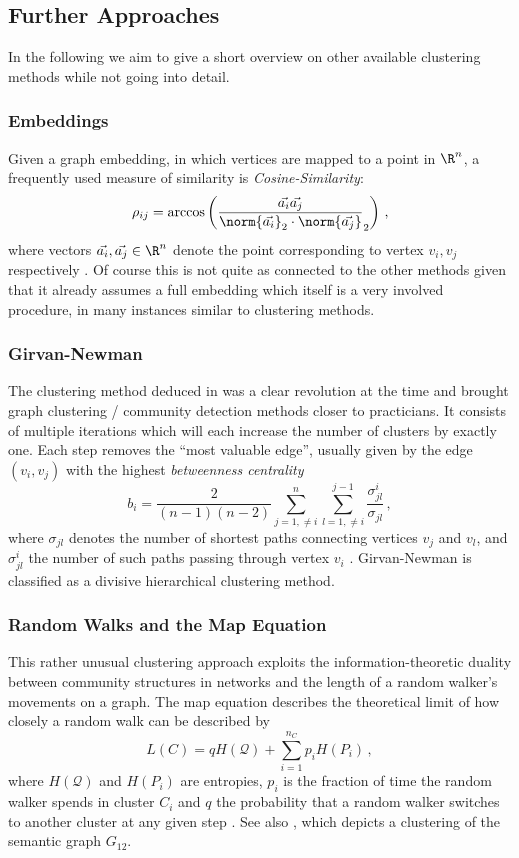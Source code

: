 \documentclass{prettytex/ox/mmsc-special-topic}
\begin{document}
  \subsection{Further Approaches}
  In the following we aim to give a short overview on other available clustering methods while not going into detail.

  \subsubsection{Embeddings}
  Given a graph embedding, in which vertices are mapped to a point in $\R^n$, a frequently used measure of similarity is \textit{Cosine-Similarity}:
  $$\rho_{ij} = \arccos\left(\frac{\vec{a_i} \vec{a_j}}{\norm{\vec{a_i}}_2 \cdot \norm{\vec{a_j}}}_2\right)\,,$$
  where vectors $\vec{a_i}, \vec{a_j} \in \R^n$ denote the point corresponding to vertex $v_i, v_j$ respectively \parencite{fortunato}.
  Of course this is not quite as connected to the other methods given that it already assumes a full embedding which itself is a very involved procedure, in many instances similar to clustering methods.

  \subsubsection{Girvan-Newman}
  The clustering method deduced in \cite{girvan-newman} was a clear revolution at the time and brought graph clustering / community detection methods closer to practicians.
  It consists of multiple iterations which will each increase the number of clusters by exactly one. Each step removes the ``most valuable edge'', usually given by the edge $(v_i, v_j)$ with the highest \textit{betweenness centrality} $$b_i = \frac{2}{(n-1)(n-2)} \sum_{j=1, \neq i}^n \sum_{l=1, \neq i}^{j-1} \frac{\sigma_{jl}^{i}}{\sigma_{jl}}\,,$$ where $\sigma_{jl}$ denotes the number of shortest paths connecting vertices $v_j$ and $v_l$, and $\sigma_{jl}^i$ the number of such paths passing through vertex $v_i$ \parencite{grindrod-lecture-notes}.
  Girvan-Newman is classified as a divisive hierarchical clustering method.

  \subsubsection{Random Walks and the Map Equation}
  \label{sec:mapequation}
  This rather unusual clustering approach exploits the information-theoretic duality between community structures in networks and the length of a random walker's movements on a graph.
  The map equation describes the theoretical limit of how closely a random walk can be described by $$L(C) = q H(\mathcal{Q}) + \sum_{i=1}^{n_C} p_i H(P_i)\,,$$
  where $H(\mathcal{Q})$ and $H(P_i)$ are entropies, $p_i$ is the fraction of time the random walker spends in cluster $C_i$ and $q$ the probability that a random walker switches to another cluster at any given step \parencite{mapequation}.
  See also , which depicts a clustering of the semantic graph $G_{12}$.
\end{document}
